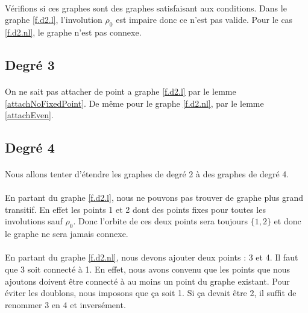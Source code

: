 \paragraph{}
Vérifions si ces graphes sont des graphes satisfaisant aux conditions. Dans le graphe \ref{f.d2.l}, l'involution $\rho_0$ est impaire donc ce n'est pas valide. Pour le cas \ref{f.d2.nl}, le graphe n'est pas connexe.

\subsection{Degré 3}

\paragraph{}
On ne sait pas attacher de point a graphe \ref{f.d2.l} par le lemme \ref{attachNoFixedPoint}. De même pour le graphe \ref{f.d2.nl}, par le lemme \ref{attachEven}.

\subsection{Degré 4}

\paragraph{}
Nous allons tenter d'étendre les graphes de degré 2 à des graphes de degré 4.

\paragraph{}
En partant du graphe \ref{f.d2.l}, nous ne pouvons pas trouver de graphe plus grand transitif. En effet les points 1 et 2 dont des points fixes pour toutes les involutions sauf $\rho_0$. Donc l'orbite de ces deux points sera toujours $\{1, 2\}$ et donc le graphe ne sera jamais connexe.

\paragraph{}
En partant du graphe \ref{f.d2.nl}, nous devons ajouter deux points : 3 et 4. Il faut que 3 soit connecté à 1. En effet, nous avons convenu que les points que nous ajoutons doivent être connecté à au moins un point du graphe existant. Pour éviter les doublons, nous imposons que ça soit 1. Si ça devait être 2, il suffit de renommer 3 en 4 et inversément.


